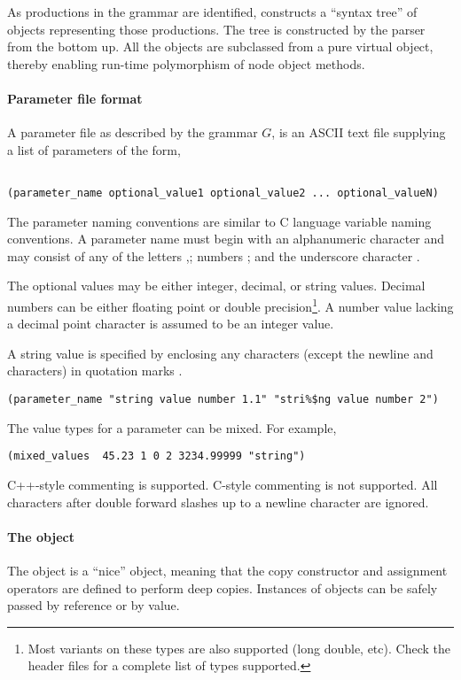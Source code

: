 \begin{appendix}
As productions in the grammar are identified,  constructs
a ``syntax tree'' of objects representing those productions. The tree is 
constructed by the parser from the bottom up.  All the objects are
subclassed from a pure virtual  object, thereby enabling
run-time polymorphism of node object methods.

\paragraph{Parameter file format}
A parameter file as described by the grammar $G$, is an ASCII text file 
supplying a list of parameters of the form,
\begin{verbatim}

(parameter_name optional_value1 optional_value2 ... optional_valueN)

\end{verbatim}

The parameter naming conventions are similar to C language variable naming
conventions.  A parameter name must begin with an alphanumeric character and
may consist of any of the letters ,; numbers ; 
and the underscore character \code{\_}.

The optional values may be either integer, decimal, or string values.  Decimal
numbers can be either floating point or  double precision\footnote{Most variants
on these types are also supported (long double, etc).  Check the header files
for a complete list of types supported.}.  A number value lacking a decimal point 
character is assumed to be an integer value.

A string value is specified by enclosing any characters (except the newline and
 characters) in quotation marks .
\begin{verbatim}
(parameter_name "string value number 1.1" "stri%$ng value number 2")
\end{verbatim}

The value types for a parameter can be mixed.  For example,
\begin{verbatim}
(mixed_values  45.23 1 0 2 3234.99999 "string")
\end{verbatim}

C++-style commenting is supported.  C-style commenting is not supported.  All
characters after double forward slashes \code{//} up to a newline character are
ignored.

\paragraph{The  object}
The  object is a ``nice'' object, meaning that the copy
constructor and assignment operators are defined to perform deep copies.
Instances of  objects can be safely passed by reference 
or by value.


\end{appendix}
